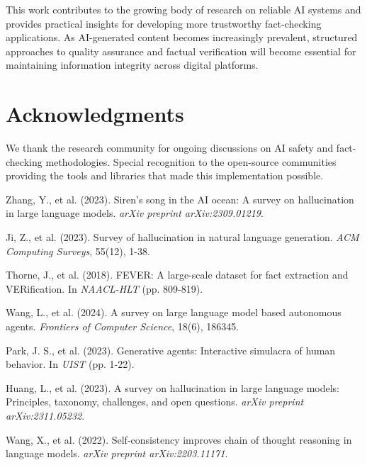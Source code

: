 \documentclass[11pt,a4paper]{article}
\begin{document}
This work contributes to the growing body of research on reliable AI systems and provides practical insights for developing more trustworthy fact-checking applications. As AI-generated content becomes increasingly prevalent, structured approaches to quality assurance and factual verification will become essential for maintaining information integrity across digital platforms.

\section*{Acknowledgments}

We thank the research community for ongoing discussions on AI safety and fact-checking methodologies. Special recognition to the open-source communities providing the tools and libraries that made this implementation possible.

\begin{thebibliography}{99}

Zhang, Y., et al. (2023). Siren's song in the AI ocean: A survey on hallucination in large language models. \textit{arXiv preprint arXiv:2309.01219}.

Ji, Z., et al. (2023). Survey of hallucination in natural language generation. \textit{ACM Computing Surveys}, 55(12), 1-38.

Thorne, J., et al. (2018). FEVER: A large-scale dataset for fact extraction and VERification. In \textit{NAACL-HLT} (pp. 809-819).

Wang, L., et al. (2024). A survey on large language model based autonomous agents. \textit{Frontiers of Computer Science}, 18(6), 186345.

Park, J. S., et al. (2023). Generative agents: Interactive simulacra of human behavior. In \textit{UIST} (pp. 1-22).

Huang, L., et al. (2023). A survey on hallucination in large language models: Principles, taxonomy, challenges, and open questions. \textit{arXiv preprint arXiv:2311.05232}.

Wang, X., et al. (2022). Self-consistency improves chain of thought reasoning in language models. \textit{arXiv preprint arXiv:2203.11171}.

\end{thebibliography}
\end{document}
